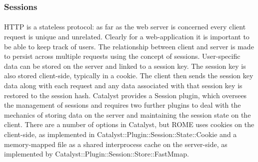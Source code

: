 \subsubsection{Sessions}
\paragraph{}
HTTP is a stateless protocol: as far as the web server is concerned every client request is unique and unrelated. Clearly for a web-application it is important to be able to keep track of users. The relationship between client and server is made to persist across multiple requests using the concept of sessions. User-specific data can be stored on the server and linked to a session key. The session key is also stored client-side, typically in a cookie. The client then sends the session key data along with each request and any data associated with that session key is restored to the session hash. Catalyst provides a Session plugin, which oversees the management of sessions and requires two further plugins to deal with the mechanics of storing data on the server and maintaining the session state on the client. There are a number of options in Catalyst, but ROME uses cookies on the client-side, as implemented in Catalyst::Plugin::Session::State::Cookie and a memory-mapped file as a shared interprocess cache on the server-side, as implemented by Catalyst::Plugin::Session::Store::FastMmap.

